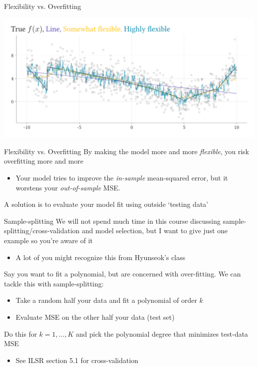 \documentclass[aspectratio=169,t,11pt,table]{beamer}
\begin{document}
\begin{frame}{Flexibility vs. Overfitting}
  \vspace{-\bigskipamount}
  \begin{center}
    \includegraphics[width = \textwidth]{figures/f_examples_overfitting.pdf}
  \end{center}
\end{frame}

\begin{frame}{Flexibility vs. Overfitting}
  By making the model more and more \emph{flexible}, you risk overfitting more and more

  \begin{itemize}
    \item Your model tries to improve the \emph{in-sample} mean-squared error, but it worstens your \emph{out-of-sample} MSE.
  \end{itemize}
  
  \bigskip
  A solution is to evaluate your model fit using outside `testing data'
\end{frame}

\begin{frame}{Sample-splitting}
  We will not spend much time in this course discussing sample-splitting/cross-validation and model selection, but I want to give just one example so you're aware of it
  \begin{itemize}
    \item A lot of you might recognize this from Hyunseok's class
  \end{itemize}

  \pause
  \bigskip
  Say you want to fit a polynomial, but are concerned with over-fitting.
  We can tackle this with sample-splitting:
  \begin{itemize}
    \item Take a random half your data and fit a polynomial of order $k$
    \item Evaluate MSE on the other half your data (test set)
  \end{itemize}
  
  \bigskip
  Do this for $k = 1, \dots, K$ and pick the polynomial degree that minimizes test-data MSE
  \begin{itemize}
    \item See ILSR section 5.1 for cross-validation 
  \end{itemize}
\end{frame}
\end{document}
